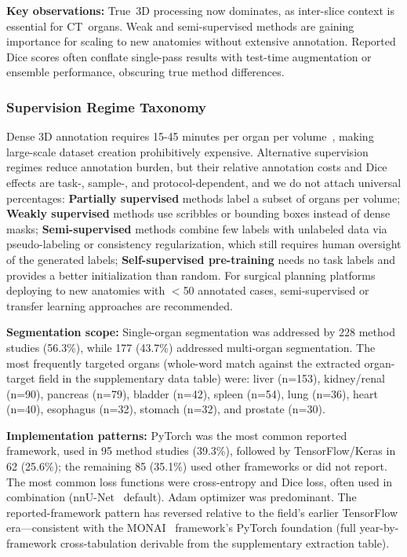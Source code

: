 \textbf{Key observations:} True~3D processing now dominates, as inter-slice context is essential for CT~organs. Weak and semi-supervised methods are gaining importance for scaling to new anatomies without extensive annotation. Reported Dice scores often conflate single-pass results with test-time augmentation or ensemble performance, obscuring true method differences.

\subsubsection{Supervision Regime Taxonomy}
\label{sec:supervision_taxonomy}

Dense 3D annotation requires 15-45 minutes per organ per volume~\cite{sharma2010automated}, making large-scale dataset creation prohibitively expensive. Alternative supervision regimes reduce annotation burden, but their relative annotation costs and Dice effects are task-, sample-, and protocol-dependent, and we do not attach universal percentages: \textbf{Partially supervised} methods label a subset of organs per volume; \textbf{Weakly supervised} methods use scribbles or bounding boxes instead of dense masks; \textbf{Semi-supervised} methods combine few labels with unlabeled data via pseudo-labeling or consistency regularization, which still requires human oversight of the generated labels; \textbf{Self-supervised pre-training} needs no task labels and provides a better initialization than random. For surgical planning platforms deploying to new anatomies with $<$50 annotated cases, semi-supervised or transfer learning approaches are recommended.

\textbf{Segmentation scope:} Single-organ segmentation was addressed by 228 method studies (56.3\%), while 177 (43.7\%) addressed multi-organ segmentation. The most frequently targeted organs (whole-word match against the extracted organ-target field in the supplementary data table) were: liver (n=153), kidney/renal (n=90), pancreas (n=79), bladder (n=42), spleen (n=54), lung (n=36), heart (n=40), esophagus (n=32), stomach (n=32), and prostate (n=30).

\textbf{Implementation patterns:} PyTorch was the most common reported framework, used in 95 method studies (39.3\%), followed by TensorFlow/Keras in 62 (25.6\%); the remaining 85 (35.1\%) used other frameworks or did not report. The most common loss functions were cross-entropy and Dice loss, often used in combination (nnU-Net~\cite{isensee2021nnunet} default). Adam optimizer was predominant. The reported-framework pattern has reversed relative to the field's earlier TensorFlow era---consistent with the MONAI~\cite{monai2022} framework's PyTorch foundation (full year-by-framework cross-tabulation derivable from the supplementary extraction table).

